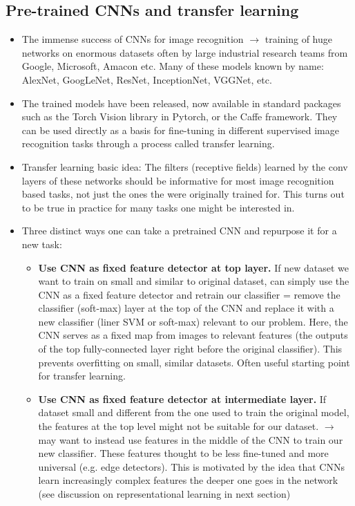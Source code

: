 \documentclass[norsk,a4paper,11pt]{article}
\begin{document}
\subsection{Pre-trained CNNs and transfer learning}
\begin{itemize}
	\item The immense success of CNNs for image recognition $\rightarrow$ training of huge networks on enormous datasets often by large industrial research teams from Google, Microsoft, Amacon etc. Many of these models known by name: AlexNet, GoogLeNet, ResNet, InceptionNet, VGGNet, etc.
	\item The trained models have been released, now available in standard packages such as the Torch Vision library in Pytorch, or the Caffe framework. They can be used directly as a basis for fine-tuning in different supervised image recognition tasks through a process called transfer learning.
	\item Transfer learning basic idea: The filters (receptive fields) learned by the conv layers of these networks should be informative for most image recognition based tasks, not just the ones the were originally trained for. This turns out to be true in practice for many tasks one might be interested in. 
	\item Three distinct ways one can take a pretrained CNN and repurpose it for a new task:
	\begin{itemize}
		\item \textbf{Use CNN as fixed feature detector at top layer.}
		If new dataset we want to train on small and similar to original dataset, can simply use the CNN as a fixed feature detector and retrain our classifier = remove the classifier (soft-max) layer at the top of the CNN and replace it with a new classifier (liner SVM or soft-max) relevant to our problem. Here, the CNN serves as a fixed map from images to relevant features (the outputs of the top fully-connected layer right before the original classifier). This prevents overfitting on small, similar datasets. Often useful starting point for transfer learning.
		\item \textbf{Use CNN as fixed feature detector at intermediate layer.}
		If dataset small and different from the one used to train the original model, the features at the top level might not be suitable for our dataset. $\rightarrow$ may want to instead use features in the middle of the CNN to train our new classifier. These features thought to be less fine-tuned and more universal (e.g. edge detectors). This is motivated by the idea that CNNs learn increasingly complex features the deeper one goes in the network (see discussion on representational learning in next section)

\end{itemize}
\end{itemize}
\end{document}
